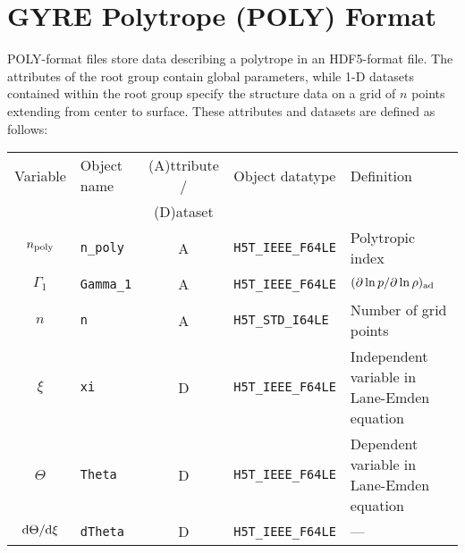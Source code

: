\documentclass{article}
\newcommand{\diff}{\ensuremath{{\rm d}}}
\begin{document}
\section*{GYRE Polytrope (POLY) Format}

POLY-format files store data describing a polytrope in an
HDF5-format file. The attributes of the root group contain global
parameters, while 1-D datasets contained within the root group
specify the structure data on a grid of $n$ points extending from
center to surface. These attributes and datasets are defined as
follows:

\begin{table}[h!]
\begin{tabular}{|c|l|c|l|l|} \hline
Variable      & Object name       & (A)ttribute / & Object datatype & Definition \\
              &                   & (D)ataset     &                 &            \\ \hline
$n_{\rm poly}$ & \texttt{n\_poly}  & A & \texttt{H5T\_IEEE\_F64LE} & Polytropic index \\
$\Gamma_{1}$  & \texttt{Gamma\_1} & A & \texttt{H5T\_IEEE\_F64LE} & $(\partial \ln p/\partial \ln \rho)_{\rm ad}$ \\
$n$          & \texttt{n}        & A &\texttt{H5T\_STD\_I64LE}   & Number of grid points \\ 
$\xi$        & \texttt{xi}       & D & \texttt{H5T\_IEEE\_F64LE} & Independent variable in Lane-Emden equation \\
$\Theta$     & \texttt{Theta}    & D & \texttt{H5T\_IEEE\_F64LE} & Dependent variable in Lane-Emden equation \\
$\diff\Theta/\diff \xi$  & \texttt{dTheta}   & D & \texttt{H5T\_IEEE\_F64LE} & --- \\ \hline
\end{tabular}
\end{table}
\end{document}
